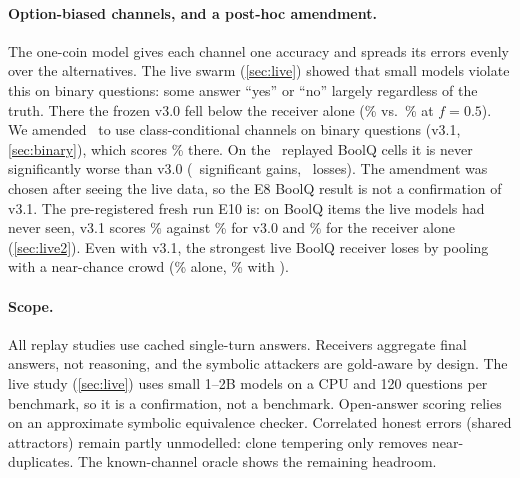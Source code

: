 \paragraph{Option-biased channels, and a post-hoc amendment.} The one-coin model gives each channel one accuracy and spreads its errors evenly over the alternatives. The live swarm (\cref{sec:live}) showed that small models violate this on binary questions: some answer ``yes'' or ``no'' largely regardless of the truth. There the frozen v3.0 fell below the receiver alone (\liveBoolqLlmVthreeFive\% vs.\ \liveBoolqLlmSelfFive\% at $f=0.5$). We amended \race\ to use class-conditional channels on binary questions (v3.1, \cref{sec:binary}), which scores \liveBoolqLlmRaceFive\% there. On the \binaryReplayCells\ replayed BoolQ cells it is never significantly worse than v3.0 (\binaryReplayWins\ significant gains, \binaryReplayLosses\ losses). The amendment was chosen after seeing the live data, so the E8 BoolQ result is not a confirmation of v3.1. The pre-registered fresh run E10 is: on BoolQ items the live models had never seen, v3.1 scores \hypHOneATarget\% against \hypHOneABase\% for v3.0 and \hypHOneBBase\% for the receiver alone (\cref{sec:live2}). Even with v3.1, the strongest live BoolQ receiver loses by pooling with a near-chance crowd (\liveGraniteSelf\% alone, \liveGraniteRace\% with \race).

\paragraph{Scope.} All replay studies use cached single-turn answers. Receivers aggregate final answers, not reasoning, and the symbolic attackers are gold-aware by design. The live study (\cref{sec:live}) uses small 1--2B models on a CPU and 120 questions per benchmark, so it is a confirmation, not a benchmark. Open-answer scoring relies on an approximate symbolic equivalence checker. Correlated honest errors (shared attractors) remain partly unmodelled: clone tempering only removes near-duplicates. The known-channel oracle shows the remaining headroom.
